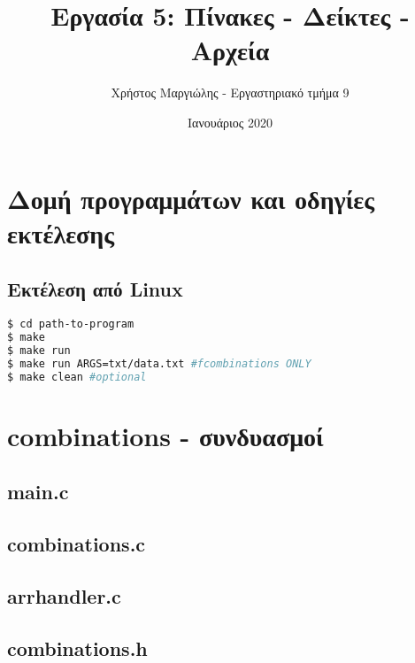 \documentclass{article}
\title{Εργασία 5: Πίνακες - Δείκτες - Αρχεία}
\author{Χρήστος Μαργιώλης - Εργαστηριακό τμήμα 9}
\date{Ιανουάριος 2020}
\begin{document}
\begin{titlepage}
    \maketitle
\end{titlepage}

\renewcommand{\contentsname}{Περιεχόμενα}
\tableofcontents

\section{Δομή προγραμμάτων και οδηγίες εκτέλεσης}

    \subsection{Εκτέλεση από Linux}
\begin{lstlisting}[language=bash]
$ cd path-to-program
$ make
$ make run
$ make run ARGS=txt/data.txt #fcombinations ONLY
$ make clean #optional
\end{lstlisting}


\section{combinations - συνδυασμοί}

    \subsection{main.c}
        

    \subsection{combinations.c}
        

    \subsection{arrhandler.c}
        

    \subsection{combinations.h}
        
\end{document}
